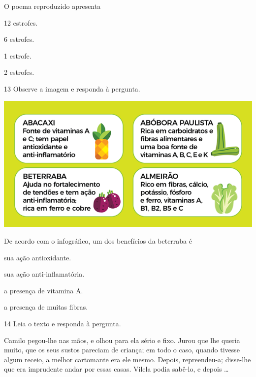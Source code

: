 O poema reproduzido apresenta

\begin{escolha}
  \item 12 estrofes.

  \item 6 estrofes.

  \item 1 estrofe.

  \item 2 estrofes.
\end{escolha}


\num{13} Observe a imagem e responda à pergunta.


\includegraphics[width=\textwidth]{./imgQ4PORT/media/image4.png}




De acordo com o infográfico, um dos benefícios da beterraba é

\begin{escolha}
  \item sua ação antioxidante.

  \item sua ação anti-inflamatória.

  \item a presença de vitamina A.

  \item a presença de muitas fibras.
\end{escolha}

\pagebreak
\num{14} Leia o texto e responda à pergunta.

\begin{myquote}
Camilo pegou-lhe nas mãos, e olhou para ela sério e fixo. Jurou que lhe
queria muito, que os seus sustos pareciam de criança; em todo o caso,
quando tivesse algum receio, a melhor cartomante era ele mesmo. Depois,
repreendeu-a; disse-lhe que era imprudente andar por essas casas. Vilela
podia sabê-lo, e depois \ldots

\end{myquote}

